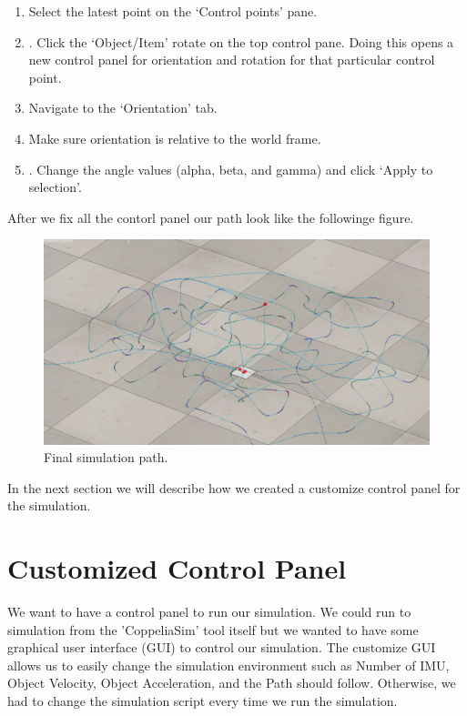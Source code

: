 \begin{enumerate}
 \item	Select the latest point on the ‘Control points’ pane.
 \item.	Click the ‘Object/Item’ rotate on the top control pane. Doing this opens a new control panel for orientation and rotation for that particular control point.
 \item	Navigate to the ‘Orientation’ tab.
 \item	Make sure orientation is relative to the world frame.
 \item.	Change the angle values (alpha, beta, and gamma) and click ‘Apply to selection’.
\end{enumerate}

After we fix all the contorl panel our path look like the followinge figure.

\begin{figure}[h]
  \centering
    \includegraphics[width=0.9\linewidth]{figures/finalPath.png}
    \caption{Final simulation path.}
\label{fig:finalPath}
\end{figure}

In the next section we will describe how we created a customize control panel for the simulation.


\section{Customized Control Panel}

We want to have a control panel to run our simulation. We could run to simulation from the 'CoppeliaSim' tool itself but we wanted to have some graphical user interface (GUI) to control our simulation. The customize GUI allows us to easily change the simulation environment such as Number of IMU, Object Velocity, Object Acceleration, and the Path should follow. Otherwise, we had to change the simulation script every time we run the simulation.

